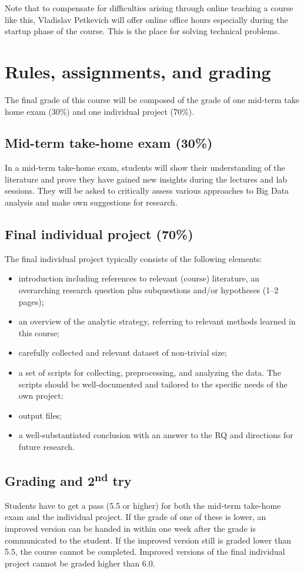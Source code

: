 \documentclass[a4paper,10pt,twocolumn]{report}
\newenvironment{corona}{%
	\begin{shaded*}%
	}{%
	\end{shaded*}%
}
\begin{document}
\begin{corona}Note that to compensate for difficulties arising through online teaching a course like this, Vladislav Petkevich will offer online office hours especially during the startup phase of the course. This is the place for solving technical problems.
\end{corona}

\chapter{Rules, assignments, and grading}
The final grade of this course will be composed of the grade of one mid-term take home exam (30\%) and one individual project (70\%).

\section{Mid-term take-home exam (30\%)}
In a mid-term take-home exam, students will show their understanding of the literature and prove they have gained new insights during the lectures and lab sessions. They will be asked to critically assess various approaches to Big Data analysis and make own suggestions for research.


\section{Final individual project (70\%)}
The final individual project typically consists of the following elements:
\begin{itemize}
	\item introduction including references to relevant (course) literature, an overarching research question plus subquestions and/or hypotheses (1–2 pages);
	\item an overview of the analytic strategy, referring to relevant methods learned in this course;
	\item carefully collected and relevant dataset of non-trivial size;
	\item a set of scripts for collecting, preprocessing, and analyzing the data. The scripts should be well-documented and tailored to the specific needs of the own project;
	\item output files;
	\item a well-substantiated conclusion with an answer to the RQ and directions for future research.
\end{itemize}


\section{Grading and 2\textsuperscript{nd} try}
Students have to get a pass (5.5 or higher) for both the mid-term take-home exam and the individual project. If the grade of one of these is lower, an improved version can be handed in within one week after the grade is communicated to the student. If the improved version still is graded lower than 5.5, the course cannot be completed. Improved versions of the final individual project cannot be graded higher than 6.0. 
\end{document}
